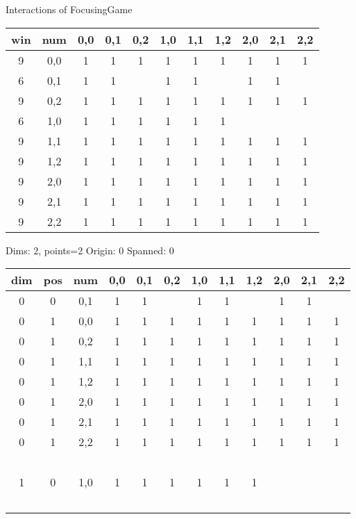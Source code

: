 Interactions of FocusingGame
\begin{tabular}{ccccccccccc}
\hline
  win  &  num  &  0,0  &  0,1  &  0,2  &  1,0  &  1,1  &  1,2  &  2,0  &  2,1  &  2,2  \\
\hline
   9   &  0,0  &   1   &   1   &   1   &   1   &   1   &   1   &   1   &   1   &   1   \\
   6   &  0,1  &   1   &   1   &       &   1   &   1   &       &   1   &   1   &       \\
   9   &  0,2  &   1   &   1   &   1   &   1   &   1   &   1   &   1   &   1   &   1   \\
   6   &  1,0  &   1   &   1   &   1   &   1   &   1   &   1   &       &       &       \\
   9   &  1,1  &   1   &   1   &   1   &   1   &   1   &   1   &   1   &   1   &   1   \\
   9   &  1,2  &   1   &   1   &   1   &   1   &   1   &   1   &   1   &   1   &   1   \\
   9   &  2,0  &   1   &   1   &   1   &   1   &   1   &   1   &   1   &   1   &   1   \\
   9   &  2,1  &   1   &   1   &   1   &   1   &   1   &   1   &   1   &   1   &   1   \\
   9   &  2,2  &   1   &   1   &   1   &   1   &   1   &   1   &   1   &   1   &   1   \\
\hline
\end{tabular}


Dims: 2, points=2 Origin: 0 Spanned: 0
\begin{tabular}{cccccccccccc}
\hline
  dim  &  pos  &  num  &  0,0  &  0,1  &  0,2  &  1,0  &  1,1  &  1,2  &  2,0  &  2,1  &  2,2  \\
\hline
   0   &   0   &  0,1  &   1   &   1   &       &   1   &   1   &       &   1   &   1   &       \\
   0   &   1   &  0,0  &   1   &   1   &   1   &   1   &   1   &   1   &   1   &   1   &   1   \\
   0   &   1   &  0,2  &   1   &   1   &   1   &   1   &   1   &   1   &   1   &   1   &   1   \\
   0   &   1   &  1,1  &   1   &   1   &   1   &   1   &   1   &   1   &   1   &   1   &   1   \\
   0   &   1   &  1,2  &   1   &   1   &   1   &   1   &   1   &   1   &   1   &   1   &   1   \\
   0   &   1   &  2,0  &   1   &   1   &   1   &   1   &   1   &   1   &   1   &   1   &   1   \\
   0   &   1   &  2,1  &   1   &   1   &   1   &   1   &   1   &   1   &   1   &   1   &   1   \\
   0   &   1   &  2,2  &   1   &   1   &   1   &   1   &   1   &   1   &   1   &   1   &   1   \\
  \\
   1   &   0   &  1,0  &   1   &   1   &   1   &   1   &   1   &   1   &       &       &       \\
  \\
\hline
\end{tabular}
